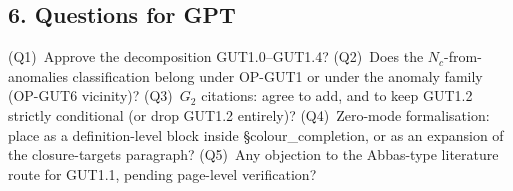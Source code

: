 \subsection*{6. Questions for GPT}
(Q1)~Approve the decomposition GUT1.0--GUT1.4?
(Q2)~Does the $N_c$-from-anomalies classification belong under
OP-GUT1 or under the anomaly family (OP-GUT6 vicinity)?
(Q3)~$G_2$ citations: agree to add, and to keep GUT1.2 strictly
conditional (or drop GUT1.2 entirely)?
(Q4)~Zero-mode formalisation: place as a definition-level block
inside \S colour\_completion, or as an expansion of the
closure-targets paragraph?
(Q5)~Any objection to the Abbas-type literature route for GUT1.1,
pending page-level verification?
